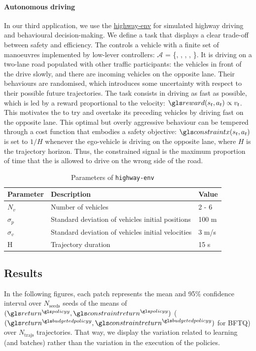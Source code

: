 \paragraph{Autonomous driving}
In our third application, we use the \href{https://github.com/eleurent/highway-env}{highway-env}  \parencite{Leurent2018} for simulated highway driving and behavioural decision-making.
We define a task that displays a clear trade-off between safety and efficiency. The  controls a vehicle with a finite set of manoeuvres implemented by low-lever controllers: $\mathcal{A}$ = \{, , , , \}. It is driving on a two-lane road populated with other traffic participants: the vehicles in front of the  drive slowly, and there are incoming vehicles on the opposite lane. Their behaviours are randomised, which introduces some uncertainty with respect to their possible future trajectories.
The task consists in driving as fast as possible, which is led by a reward proportional to the velocity: $\reward(s_t, a_t) \propto v_t$. This motivates the  to try and overtake its preceding vehicles by driving fast on the opposite lane. This optimal but overly aggressive behaviour can be tempered through a cost function that embodies a safety objective: $\constraint(s_t, a_t)$ is set to $1/H$ whenever the ego-vehicle is driving on the opposite lane, where $H$ is the trajectory horizon. Thus, the constrained signal is the maximum proportion of time that the  is allowed to drive on the wrong side of the road.

\begin{table}[ht!]
    \centering
    \begin{tabularx}{1.0\textwidth}{lll}
        \toprule
        Parameter & Description & Value\tabularnewline
        \midrule
        $N_v$& Number of vehicles & 2 - 6\tabularnewline
        $\sigma_p$& Standard deviation of vehicles initial positions & 100 m\tabularnewline
        $\sigma_v$& Standard deviation of vehicles initial velocities & 3 m/s\tabularnewline
        H & Trajectory\index{trajectory} duration & 15 s\tabularnewline
        \bottomrule
    \end{tabularx}

    \caption{Parameters of \texttt{highway-env}}
    \label{tab:param-highway-env}
\end{table}

\subsection{Results}
\label{subsec:results}
In the following figures, each patch represents the mean and 95\% confidence interval over $N_{\text{seeds}}$ seeds of the means of $(\return^{\policy},\constraintreturn^{\policy})$ ($(\return^{\budgetedpolicy},\constraintreturn^{\budgetedpolicy})$ for \gls{BFTQ}) over $N_\text{trajs}$ trajectories. That way, we display the variation related to learning (and batches) rather than the variation in the execution of the policies.

